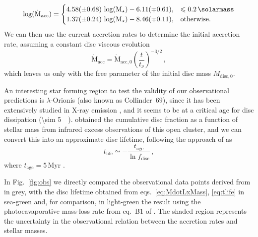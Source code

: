\documentclass[usenatbib,useAMS,usedcolumn]{mnras}
\begin{document}
\begin{equation}\label{eq:mdotAlcala}
    \log(\dot{\mathrm{M}}_\mathrm{acc}) = 
    \begin{cases}
      4.58 (\pm 0.68) \, \log(\mathrm{M}_\star) - 6.11(\mp 0.61), & \leq \SI{0.2}{\solarmass} \\
      1.37 (\pm 0.24) \, \log(\mathrm{M}_\star) - 8.46 (\mp 0.11), & \text{otherwise.}
    \end{cases}
\end{equation}
We can then use the current accretion rates to determine the initial accretion rate, assuming a constant disc viscous evolution
\begin{equation}\label{eq:mdot0}
    \dot{\mathrm{M}}_\mathrm{acc} = \dot{\mathrm{M}}_\mathrm{acc,0} \left(\frac{t}{t_\nu}\right)^{-3/2}\,,
\end{equation}
which leaves us only with the free parameter of the initial disc mass $M_\mathrm{disc,0}$.

An interesting star forming region to test the validity of our observational predictions is $\lambda$-Orionis (also known as Collinder~$69$), since it has been extensively studied in X-ray emission , and it seems to be at a critical age for disc dissipation (\SI{\sim 5}{\mega\year}).
 obtained the cumulative disc fraction as a function of stellar mass from infrared excess observations of this open cluster, and we can convert this into an approximate disc lifetime, following the approach of  as
\begin{equation}
    t_\mathrm{life} \simeq -\frac{t_\mathrm{age}}{\ln{f_\mathrm{disc}}}\, ,
\end{equation}
where $t_\mathrm{age} = 5\, \mathrm{Myr}$ .

In Fig.~\ref{fig:obs} we directly compared the observational data points derived from  in grey, with the disc lifetime obtained from eqs.~\ref{eq:MdotLxMass}, \ref{eq:tlife} in sea-green and, for comparison, in light-green the result using the photoeavaporative mass-loss rate from eq.~B1 of . The shaded region represents the uncertainty in the observational relation between the accretion rates and stellar masses.
\end{document}
